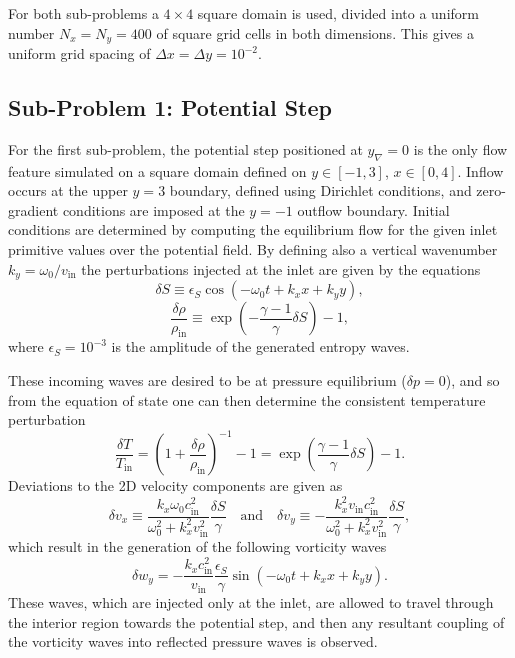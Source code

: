 For both sub-problems a $4\times4$ square domain is used, divided into a uniform number $N_x=N_y=400$ of square grid cells in both dimensions. This gives a uniform grid spacing of $\Delta x=\Delta y=10^{-2}$.

\subsection{Sub-Problem 1: Potential Step}
\label{subsec:sub_problem_1}

For the first sub-problem, the potential step positioned at $y_\nabla=0$ is the only flow feature simulated on a square domain defined on $y\in[-1,3]$, $x\in[0,4]$. Inflow occurs at the upper $y=3$ boundary, defined using Dirichlet conditions, and zero-gradient conditions are imposed at the $y=-1$ outflow boundary. Initial conditions are determined by computing the equilibrium flow for the given inlet primitive values over the potential field. By defining also a vertical wavenumber $k_y=\omega_0/v_\textrm{in}$ the perturbations injected at the inlet are given by the equations
\begin{equation}
\delta S\equiv\epsilon_S\cos\left(-\omega_0t+k_xx+k_yy\right),
\end{equation}
\begin{equation}
\frac{\delta \rho}{\rho_\textrm{in}}\equiv\exp\left(-\frac{\gamma-1}{\gamma}\delta S\right)-1,
\end{equation}
where $\epsilon_S=10^{-3}$ is the amplitude of the generated entropy waves.

These incoming waves are desired to be at pressure equilibrium ($\delta p=0$), and so from the equation of state one can then determine the consistent temperature perturbation
\begin{equation}
\frac{\delta T}{T_\textrm{in}}=\left(1+\frac{\delta\rho}{\rho_\textrm{in}}\right)^{-1}-1=\exp\left(\frac{\gamma-1}{\gamma}\delta S\right)-1.
\end{equation}
Deviations to the 2D velocity components are given as
\begin{equation}
\delta v_x\equiv\frac{k_x\omega_0c_\textrm{in}^2}{\omega_0^2+k_x^2v_\textrm{in}^2}\frac{\delta S}{\gamma} \quad \textrm{and} \quad \delta v_y\equiv-\frac{k_x^2v_\textrm{in}c_\textrm{in}^2}{\omega_0^2+k_x^2v_\textrm{in}^2}\frac{\delta S}{\gamma},
\end{equation}
which result in the generation of the following vorticity waves 
\begin{equation}
\delta w_y=-\frac{k_xc_\textrm{in}^2}{v_\textrm{in}}\frac{\epsilon_S}{\gamma}\sin\left(-\omega_0t+k_xx+k_yy\right).
\end{equation}
These waves, which are injected only at the inlet, are allowed to travel through the interior region towards the potential step, and then any resultant coupling of the vorticity waves into reflected pressure waves is observed.

